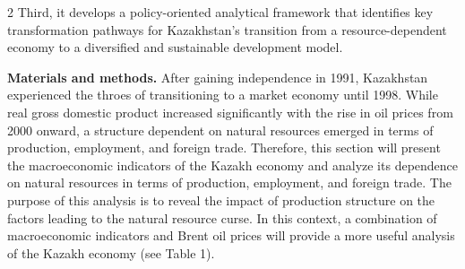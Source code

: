 \begin{multicols}{2}
Third, it develops a policy-oriented analytical framework that
identifies key transformation pathways for Kazakhstan's transition from
a resource-dependent economy to a diversified and sustainable
development model.

{\bfseries Materials and methods.} After gaining independence in 1991,
Kazakhstan experienced the throes of transitioning to a market economy
until 1998. While real gross domestic product increased significantly
with the rise in oil prices from 2000 onward, a structure dependent on
natural resources emerged in terms of production, employment, and
foreign trade. Therefore, this section will present the macroeconomic
indicators of the Kazakh economy and analyze its dependence on natural
resources in terms of production, employment, and foreign trade. The
purpose of this analysis is to reveal the impact of production structure
on the factors leading to the natural resource curse. In this context, a
combination of macroeconomic indicators and Brent oil prices will
provide a more useful analysis of the Kazakh economy (see Table 1).
\end{multicols}


